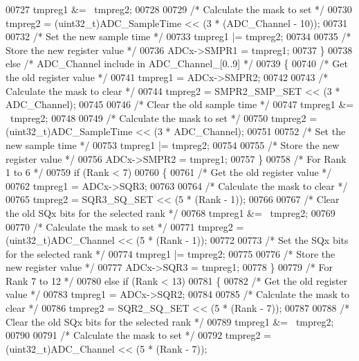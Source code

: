 \begin{DoxyCode}
00727     tmpreg1 &= ~tmpreg2;
00728 
00729     \textcolor{comment}{/* Calculate the mask to set */}
00730     tmpreg2 = (uint32\_t)ADC\_SampleTime << (3 * (ADC\_Channel - 10));
00731 
00732     \textcolor{comment}{/* Set the new sample time */}
00733     tmpreg1 |= tmpreg2;
00734 
00735     \textcolor{comment}{/* Store the new register value */}
00736     ADCx->SMPR1 = tmpreg1;
00737   \}
00738   \textcolor{keywordflow}{else} \textcolor{comment}{/* ADC\_Channel include in ADC\_Channel\_[0..9] */}
00739   \{
00740     \textcolor{comment}{/* Get the old register value */}
00741     tmpreg1 = ADCx->SMPR2;
00742 
00743     \textcolor{comment}{/* Calculate the mask to clear */}
00744     tmpreg2 = SMPR2_SMP_SET << (3 * ADC\_Channel);
00745 
00746     \textcolor{comment}{/* Clear the old sample time */}
00747     tmpreg1 &= ~tmpreg2;
00748 
00749     \textcolor{comment}{/* Calculate the mask to set */}
00750     tmpreg2 = (uint32\_t)ADC\_SampleTime << (3 * ADC\_Channel);
00751 
00752     \textcolor{comment}{/* Set the new sample time */}
00753     tmpreg1 |= tmpreg2;
00754 
00755     \textcolor{comment}{/* Store the new register value */}
00756     ADCx->SMPR2 = tmpreg1;
00757   \}
00758   \textcolor{comment}{/* For Rank 1 to 6 */}
00759   \textcolor{keywordflow}{if} (Rank < 7)
00760   \{
00761     \textcolor{comment}{/* Get the old register value */}
00762     tmpreg1 = ADCx->SQR3;
00763 
00764     \textcolor{comment}{/* Calculate the mask to clear */}
00765     tmpreg2 = SQR3_SQ_SET << (5 * (Rank - 1));
00766 
00767     \textcolor{comment}{/* Clear the old SQx bits for the selected rank */}
00768     tmpreg1 &= ~tmpreg2;
00769 
00770     \textcolor{comment}{/* Calculate the mask to set */}
00771     tmpreg2 = (uint32\_t)ADC\_Channel << (5 * (Rank - 1));
00772 
00773     \textcolor{comment}{/* Set the SQx bits for the selected rank */}
00774     tmpreg1 |= tmpreg2;
00775 
00776     \textcolor{comment}{/* Store the new register value */}
00777     ADCx->SQR3 = tmpreg1;
00778   \}
00779   \textcolor{comment}{/* For Rank 7 to 12 */}
00780   \textcolor{keywordflow}{else} \textcolor{keywordflow}{if} (Rank < 13)
00781   \{
00782     \textcolor{comment}{/* Get the old register value */}
00783     tmpreg1 = ADCx->SQR2;
00784 
00785     \textcolor{comment}{/* Calculate the mask to clear */}
00786     tmpreg2 = SQR2_SQ_SET << (5 * (Rank - 7));
00787 
00788     \textcolor{comment}{/* Clear the old SQx bits for the selected rank */}
00789     tmpreg1 &= ~tmpreg2;
00790 
00791     \textcolor{comment}{/* Calculate the mask to set */}
00792     tmpreg2 = (uint32\_t)ADC\_Channel << (5 * (Rank - 7));

\end{DoxyCode}
